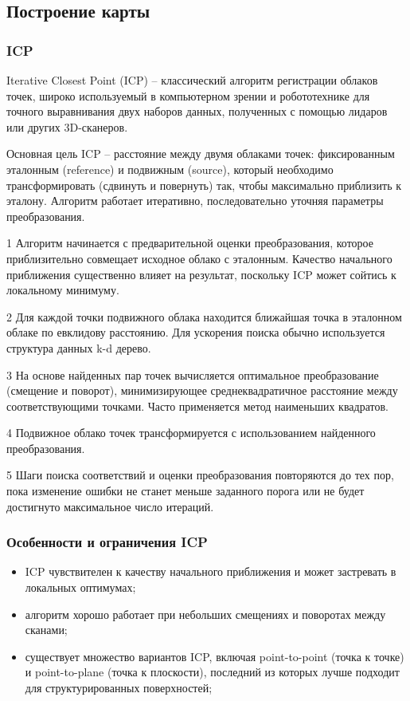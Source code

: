 {\subsection{Построение карты}

\subsubsection{ICP}
Iterative Closest Point (ICP) -- классический алгоритм регистрации облаков
точек, широко используемый в компьютерном зрении и робототехнике для точного
выравнивания двух наборов данных, полученных с помощью лидаров или других
3D-сканеров.

Основная цель ICP -- расстояние между двумя облаками точек:
фиксированным эталонным (reference) и подвижным (source), который необходимо
трансформировать (сдвинуть и повернуть) так, чтобы максимально приблизить к
эталону. Алгоритм работает итеративно, последовательно уточняя параметры
преобразования.

1 Алгоритм начинается с предварительной оценки преобразования, которое
приблизительно совмещает исходное облако с эталонным. Качество начального
приближения существенно влияет на результат, поскольку ICP может сойтись к
локальному минимуму.
    
2 Для каждой точки подвижного облака находится ближайшая точка в эталонном
облаке по евклидову расстоянию. Для ускорения поиска обычно используется
структура данных k-d дерево.
    
3 На основе найденных пар точек вычисляется оптимальное преобразование (смещение
и поворот), минимизирующее среднеквадратичное расстояние между соответствующими
точками. Часто применяется метод наименьших квадратов.
    
4 Подвижное облако точек трансформируется с использованием найденного
преобразования.
    
5 Шаги поиска соответствий и оценки преобразования повторяются до тех пор, пока
изменение ошибки не станет меньше заданного порога или не будет достигнуто
максимальное число итераций.

\subsubsection{Особенности и ограничения ICP}
\begin{itemize}
	\item ICP чувствителен к качеству начального приближения и может застревать
		в локальных оптимумах;
	\item алгоритм хорошо работает при небольших смещениях и поворотах между
		сканами;
	\item существует множество вариантов ICP, включая point-to-point (точка к
		точке) и point-to-plane (точка к плоскости), последний из которых лучше
		подходит для структурированных поверхностей;
\end{itemize}

}
